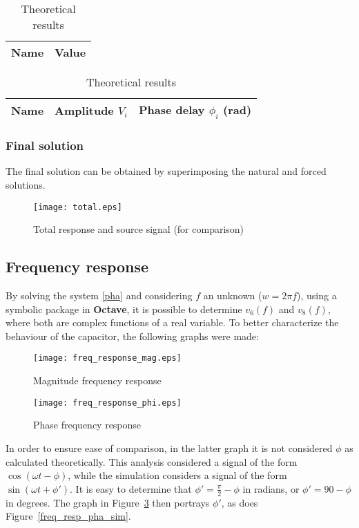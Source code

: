 \begin{table}[H]
  \centering
  \begin{tabular}{|c|c|}
    \hline
        {\bf Name} & {\bf Value} \\
        \hline
        \hline
        
        \hline
  \end{tabular}
  \caption{Theoretical results}
  \label{forced_res}
\end{table}

\begin{table}[H]
  \centering
  \begin{tabular}{|c|c|c|}
    \hline
        {\bf Name} & {\bf Amplitude $V_i$} & {\bf Phase delay $\phi_i$ (rad)} \\
        \hline
        \hline
        
        \hline
  \end{tabular}
  \caption{Theoretical results}
  \label{forcedamplitudes_res}
\end{table}

\subsubsection{Final solution}

The final solution can be obtained by superimposing the natural and forced solutions.

\begin{figure}[H]
  \centering
  \texttt{[image: total.eps]}
  \caption{Total response and source signal (for comparison)}
  \label{fig:tot}
\end{figure}

\subsection{Frequency response}

By solving the system \ref{pha} and considering $f$ an unknown ($w=2\pi f$), using a symbolic package in \textbf{Octave}, it is possible to determine $v_6(f)$ and $v_8(f)$, where both are complex functions of a real variable. To better characterize the behaviour of the capacitor, the following graphs were made:

\begin{figure}[H]
  \centering
  \texttt{[image: freq\_response\_mag.eps]}
  \caption{Magnitude frequency response}
  \label{freq_resp_mag}
\end{figure}

\begin{figure}[H]
  \centering
  \texttt{[image: freq\_response\_phi.eps]}
  \caption{Phase frequency response}
  \label{freq_resp_pha}
\end{figure}

In order to ensure ease of comparison, in the latter graph it is not considered $\phi$ as calculated theoretically. This analysis considered a signal of the form $\cos(\omega t - \phi)$, while the simulation considers a signal of the form $\sin(\omega t + \phi')$. It is easy to determine that $\phi' = \frac{\pi}{2} - \phi$ in radians, or $\phi' = 90 - \phi$ in degrees. The graph in Figure~\ref{freq_resp_pha} then portrays $\phi'$, as does Figure~\ref{freq_resp_pha_sim}.
